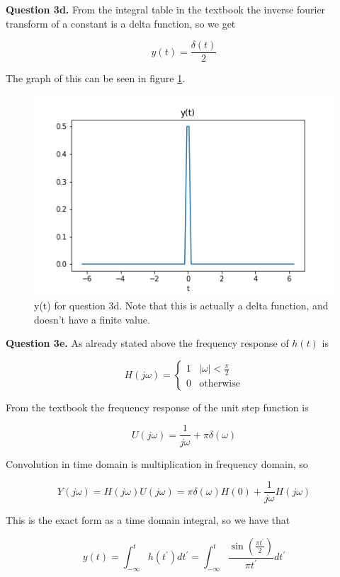 \documentclass[letterpaper, reqno,11pt]{article}
\begin{document}
{\noindent\bf Question 3d.} From the integral table in the textbook the inverse fourier transform of a constant is a delta function, so we get 

\[
    y(t)=\frac{\delta(t)}{2}
\]

The graph of this can be seen in figure \ref{fig:q3d}. 

\begin{figure}[htbp]
\centering
\includegraphics[width=\textwidth]{q3d}
\caption{y(t) for question 3d. Note that this is actually a delta function, and doesn't have a finite value. }
\label{fig:q3d}
\end{figure}

{\noindent\bf Question 3e.} As already stated above the frequency response of $h(t)$ is 

\[
    H(j\omega)=\begin{cases}1&|\omega|<\frac\pi2\\0&\text{otherwise}\end{cases}
\]

From the textbook the frequency response of the unit step function is

\[
    U(j\omega)=\frac1{j\omega}+\pi\delta(\omega)
\]

Convolution in time domain is multiplication in frequency domain, so 

\[
    Y(j\omega)=H(j\omega)U(j\omega)=\pi\delta(\omega)H(0)+\frac1{j\omega}H(j\omega)
\]

This is the exact form as a time domain integral, so we have that 

\[
    y(t)=\int_{-\infty}^t h(t^\prime)dt^\prime=\int_{-\infty}^t \frac{\sin(\frac{\pi t^\prime}2)}{\pi t^\prime}dt^\prime
\]
\end{document}
